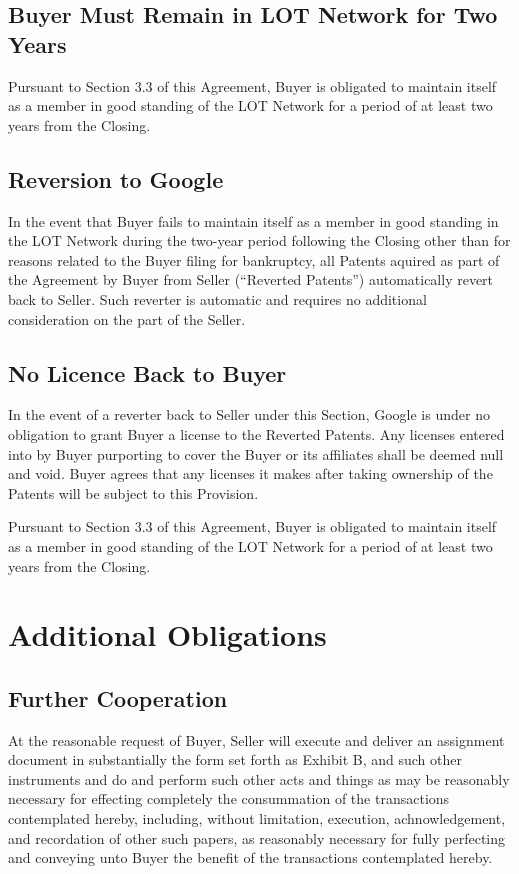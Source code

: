 \documentclass[letterpaper,10pt,english]{sphinxmanual}
\begin{document}
\subsection{Buyer Must Remain in LOT Network for Two Years}
\label{\detokenize{4-reversionary:buyer-must-remain-in-lot-network-for-two-years}}
Pursuant to Section 3.3 of this Agreement, Buyer is obligated to maintain itself as a member in good standing of the LOT Network for a period of at least two years from the Closing.


\subsection{Reversion to Google}
\label{\detokenize{4-reversionary:reversion-to-google}}
In the event that Buyer fails to maintain itself as a member in good standing in the LOT Network during the two-year period following the Closing other than for reasons related to the Buyer filing for bankruptcy, all Patents aquired as part of the Agreement by Buyer from Seller (“Reverted Patents”) automatically revert back to Seller. Such reverter is automatic and requires no additional consideration on the part of the Seller.


\subsection{No Licence Back to Buyer}
\label{\detokenize{4-reversionary:no-licence-back-to-buyer}}
In the event of a reverter back to Seller under this Section, Google is under no obligation to grant Buyer a license to the Reverted Patents. Any licenses entered into by Buyer purporting to cover the Buyer or its affiliates shall be deemed null and void. Buyer agrees that any licenses it makes after taking ownership of the Patents will be subject to this Provision.

Pursuant to Section 3.3 of this Agreement, Buyer is obligated to maintain itself as a member in good standing of the LOT Network for a period of at least two years from the Closing.


\section{Additional Obligations}
\label{\detokenize{5-additionalobligations:additional-obligations}}\label{\detokenize{5-additionalobligations::doc}}

\subsection{Further Cooperation}
\label{\detokenize{5-additionalobligations:further-cooperation}}
At the reasonable request of Buyer, Seller will execute and deliver an assignment document in substantially the form set forth as Exhibit B, and such other instruments and do and perform such other acts and things as may be reasonably necessary for effecting completely the consummation of the transactions contemplated hereby, including, without limitation, execution, achnowledgement, and recordation of other such papers, as reasonably necessary for fully perfecting and conveying unto Buyer the benefit of the transactions contemplated hereby.
\end{document}
